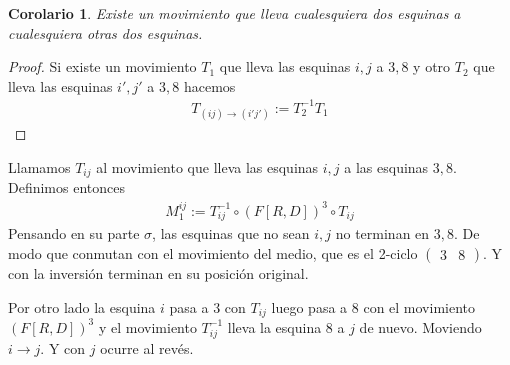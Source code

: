 \documentclass{article}
\newtheorem{corolario}{Corolario}[section]
\theoremstyle{definition}
\begin{document}
\begin{corolario}
    Existe un movimiento que lleva cualesquiera dos esquinas a cualesquiera otras dos esquinas.
\end{corolario}
\begin{proof}
    Si existe un movimiento $T_1$ que lleva las esquinas $i,j$ a $3,8$ y otro $T_2$ que lleva las esquinas $i',j'$ a $3,8$ hacemos
    \begin{align*}
        T_{(ij)\to (i'j')}:=T_2^{-1}T_1
    \end{align*}
\end{proof}
Llamamos $T_{ij}$ al movimiento que lleva las esquinas $i,j$ a las esquinas $3,8$. Definimos entonces
\begin{align*}
    M_{1}^{ij}:=T_{ij}^{-1} \circ (F[R,D])^3\circ T_{ij}
\end{align*}
Pensando en su parte $\sigma$, las esquinas que no sean $i,j$ no terminan en $3,8$. De modo que conmutan con el movimiento del medio, que es el 2-ciclo $\begin{pmatrix}
        3 & 8
    \end{pmatrix}$. Y con la inversión terminan en su posición original.

Por otro lado la esquina $i$ pasa a $3$ con $T_{ij}$ luego pasa a $8$ con el movimiento $(F[R,D])^3$ y el movimiento $T_{ij}^{-1}$ lleva la esquina $8$ a $j$ de nuevo. Moviendo $i\to j$. Y con $j$ ocurre al revés.
\end{document}
